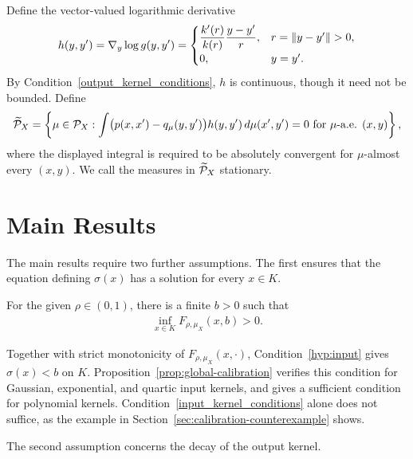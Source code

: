 Define the vector-valued logarithmic derivative
\begin{align}\label{eq:force}
h(y,y')=\nabla_y\log g(y,y')=
\begin{cases}
\displaystyle\frac{k'(r)}{k(r)}\frac{y-y'}r,&r=\left\lVert y-y'\right\rVert>0,\\[2pt]
0,&y=y'.
\end{cases}
\end{align}
By Condition~\ref{output_kernel_conditions}, $h$ is continuous, though it need not be bounded. Define
\begin{align}\label{eq:stationary-class}
\widetilde{\mathcal P}_X=\left\{\mu\in\mathcal P_X:
\int\bigl(p(x,x')-q_\mu(y,y')\bigr)h(y,y')\,d\mu(x',y')=0
\text{ for }\mu\text{-a.e. }(x,y)\right\},
\end{align}
where the displayed integral is required to be absolutely convergent for $\mu$-almost every $(x,y)$. We call the measures in $\widetilde{\mathcal P}_X$ stationary.

\section{Main Results}\label{tsne:sec:main_results}
The main results require two further assumptions. The first ensures that the equation defining $\sigma(x)$ has a solution for every $x\in K$.

\begin{condition}\label{hyp:input}
For the given $\rho\in(0,1)$, there is a finite $b>0$ such that
\begin{align}\label{eq:uniform-upper-bracket}
\inf_{x\in K}F_{\rho,\mu_X}(x,b)>0.
\end{align}
\end{condition}
Together with strict monotonicity of $F_{\rho,\mu_X}(x,\cdot)$, Condition~\ref{hyp:input} gives $\sigma(x)<b$ on $K$. Proposition~\ref{prop:global-calibration} verifies this condition for Gaussian, exponential, and quartic input kernels, and gives a sufficient condition for polynomial kernels. Condition~\ref{input_kernel_conditions} alone does not suffice, as the example in Section~\ref{sec:calibration-counterexample} shows.

The second assumption concerns the decay of the output kernel.

